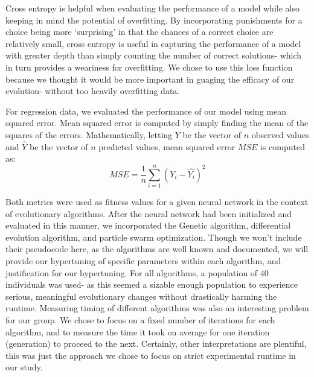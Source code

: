 \documentclass[twoside,11pt]{article}
\begin{document}
Cross entropy is helpful when evaluating the performance of a model while also keeping in mind the potential of overfitting. By incorporating punishments for a choice being more 
`surprising' in that the chances of a correct choice are relatively small, cross entropy is useful in capturing the performance of a model with greater depth than simply 
counting the number of correct solutions- which in turn provides a weariness for overfitting.
We chose to use this loss function because we thought it would be more important in guaging the efficacy of our evolution- without too
heavily overfitting data. 

For regression data, we evaluated the performance of our model using mean squared error. Mean squared error is computed by
simply finding the mean of the squares of the errors. Mathematically, letting $Y$ be the vector of $n$ observed values and $\hat{Y}$ be the vector of $n$ predicted
values, mean squared error $MSE$ is computed as:
\begin{equation}
MSE = \frac{1}{n} \sum_{i=1}^{n} (Y_i - \hat{Y_i})^2
\end{equation}

Both metrics were used as fitness values for a given neural network in the context of evolutionary algorithms. After the neural network had been initialized and evaluated
in this manner, we incorporated the Genetic algorithm, differential evolution algorithm, and particle swarm optimization. Though we won't include their pseudocode here,
as the algorithms are well known and documented, we will provide our hypertuning of specific parameters within each algorithm, and justification for our hypertuning. For all
algorithms, a population of 40 individuals was used- as this seemed a sizable enough population to experience serious, meaningful evolutionary changes without drastically
harming the runtime. Measuring timing of different algorithms was also an interesting problem for our group. We chose to focus on a fixed number of iterations for each algorithm,
and to measure the time it took on average for one iteration (generation) to proceed to the next. Certainly, other interpretations are plentiful, this was just the approach
we chose to focus on strict experimental runtime in our study.
\end{document}
